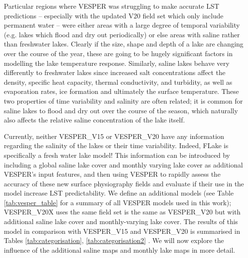 \documentclass[hess, twostagejnl]{copernicus}
\begin{document}
Particular regions where VESPER was struggling to make accurate LST predictions – especially with the updated V20 field set which only include permanent water – were either areas with a large degree of temporal variability (e.g. lakes which flood and dry out periodically) or else areas with saline rather than freshwater lakes. Clearly if the size, shape and depth of a lake are changing over the course of the year, these are going to be hugely significant factors in modelling the lake temperature response. Similarly, saline lakes behave very differently to freshwater lakes since increased salt concentrations affect the density, specific heat capacity, thermal conductivity, and turbidity, as well as evaporation rates, ice formation and ultimately the surface temperature. These two properties of time variability and salinity are often related; it is common for saline lakes to flood and dry out over the course of the season, which naturally also affects the relative saline concentration of the lake itself. \newline 


Currently, neither VESPER\_V15 or VESPER\_V20 have any information regarding the salinity of the lakes or their time variability. Indeed, FLake is specifically a fresh water lake model! This information can be introduced by including a global saline lake cover and monthly varying lake cover as additional VESPER’s input features, and then using VESPER to rapidly assess the accuracy of these new surface physiography fields and evaluate if their use in the model increase LST predictability. We define an additional models (see Table \ref{tab:vesper_table} for a summary of all VESPER models used in this work); VESPER\_V20X uses the same field set is the same as VESPER\_V20 but with additional saline lake cover and monthly-varying lake cover. The results of this model in comparison with VESPER\_V15 and VESPER\_V20 is summarised in Tables \ref{tab:categorisation}, \ref{tab:categorisation2} . We will now explore the influence of the additional saline maps and monthly lake maps in more detail.
\end{document}
